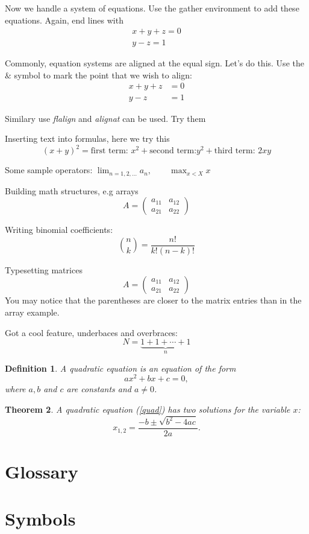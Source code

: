 \documentclass[a4paper,12pt]{book}
\newtheorem{thm}{Theorem}
\newtheorem{dfn}[thm]{Definition}
\begin{document}
Now we handle a system of equations. Use the gather environment to add these equations. Again, end lines with
\begin{gather}
 x + y + z = 0 \\
 y - z = 1
\end{gather}


Commonly, equation systems are aligned at the equal sign. Let's do this. Use the $\&$ symbol to mark the point that we wish to align:
\begin{align}
 x + y + z &= 0 \\
 y - z &= 1
\end{align}

Similary use \emph{flalign} and \emph{alignat} can be used. Try them

Inserting text into formulas, here we try this
\begin{equation} \label{key2}
 (x+y)^2 = \text{first term: } x^2 + \text{second term:} y^2 +  \text{third term: } 2xy
\end{equation}

Some sample operators:
\(
  \lim_{n=1, 2, \ldots} a_n, \qquad \max_{x<X} x
\)

Building math structures, e.g arrays
\[
 A = \left(
 \begin{array}{cc}
 a_{11} & a_{12} \\
 a_{21} & a_{22}
 \end{array}
 \right)
\]

Writing binomial coefficients:
\[
  \binom{n}{k} = \frac{n!}{k!(n-k)!}
\]

Typesetting matrices
\[
A = \begin{pmatrix}
      a_{11} & a_{12} \\
      a_{21} & a_{22}
    \end{pmatrix}
\]
You may notice that the parentheses are closer to the matrix entries than in the array example.

Got a cool feature, underbaces and overbraces:
\[
N = \underbrace{1 + 1 + \cdots + 1}_n
\]

\begin{dfn}
A quadratic equation is an equation of the form
  \begin{equation} \label{quad}
    ax^2 + bx + c = 0,
  \end{equation}
  where \( a, b \) and \( c \) are constants and \( a \neq 0 \).
\end{dfn}

\begin{thm}
A quadratic equation (\ref{quad}) has two solutions for the variable
\( x \):
\begin{equation}
 \label{root}
 x_{1,2} = \frac{-b \pm \sqrt{b^2-4ac}}{2a}.
\end{equation}
\end{thm}





\appendix
\cleardoublepage
{}
\chapter{Glossary}
\chapter{Symbols}
\end{document}
